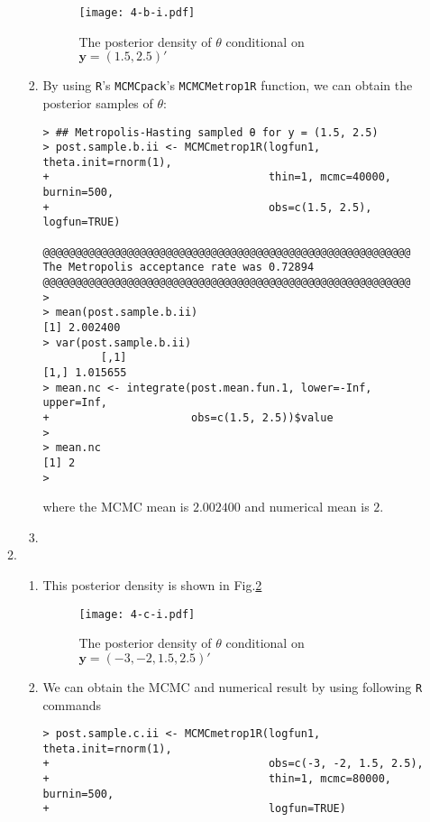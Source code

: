 \documentclass[twoside,11pt]{amsart}
\begin{document}
\begin{enumerate}
\begin{enumerate}
\begin{enumerate}
      \begin{figure}[h]
        \texttt{[image: 4-b-i.pdf]}
        \caption{The posterior density of $\theta$ conditional on $\bm
          y = (1.5, 2.5)'$}\label{fig:4-b-i}
      \end{figure}

    \item
      By using {\tt R}'s {\tt MCMCpack}'s {\tt MCMCMetrop1R} function,
      we can obtain the posterior samples of $\theta$:      
      \begin{small}
      \begin{verbatim}
> ## Metropolis-Hasting sampled θ for y = (1.5, 2.5)
> post.sample.b.ii <- MCMCmetrop1R(logfun1, theta.init=rnorm(1), 
+                                  thin=1, mcmc=40000, burnin=500, 
+                                  obs=c(1.5, 2.5), logfun=TRUE) 

@@@@@@@@@@@@@@@@@@@@@@@@@@@@@@@@@@@@@@@@@@@@@@@@@@@@@@@@@
The Metropolis acceptance rate was 0.72894
@@@@@@@@@@@@@@@@@@@@@@@@@@@@@@@@@@@@@@@@@@@@@@@@@@@@@@@@@
> 
> mean(post.sample.b.ii)
[1] 2.002400
> var(post.sample.b.ii)
         [,1]
[1,] 1.015655
> mean.nc <- integrate(post.mean.fun.1, lower=-Inf, upper=Inf, 
+                      obs=c(1.5, 2.5))$value
> 
> mean.nc
[1] 2
>         
      \end{verbatim}
      \end{small}
      where the MCMC mean is $2.002400$ and numerical mean is $2$.
    \item
    \end{enumerate}
  \item
    \begin{enumerate}
    \item This posterior density is shown in Fig.\ref{fig:4-c-i}
      \begin{figure}[h]
        \texttt{[image: 4-c-i.pdf]}
        \caption{The posterior density of $\theta$ conditional on $\bm
          y = (-3, -2, 1.5, 2.5)'$}\label{fig:4-c-i}
      \end{figure}
    \item
      We can obtain the MCMC and numerical result by using following
      {\tt R} commands
      \begin{small}
      \begin{verbatim}
> post.sample.c.ii <- MCMCmetrop1R(logfun1, theta.init=rnorm(1), 
+                                  obs=c(-3, -2, 1.5, 2.5),
+                                  thin=1, mcmc=80000, burnin=500, 
+                                  logfun=TRUE) 


\end{verbatim}
\end{small}
\end{enumerate}
\end{enumerate}
\end{enumerate}
\end{document}
